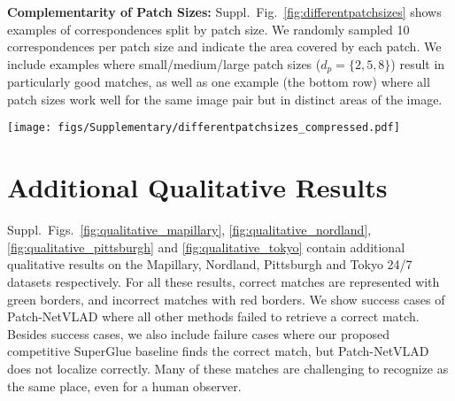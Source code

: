 \textbf{Complementarity of Patch Sizes:}
Suppl.~Fig.~\ref{fig:differentpatchsizes} shows examples of correspondences split by patch size. We randomly sampled 10 correspondences per patch size and indicate the area covered by each patch. We include examples where small/medium/large patch sizes (\ie $d_p=\{2, 5, 8\}$) result in particularly good matches, as well as one example (the bottom row) where all patch sizes work well for the same image pair but in distinct areas of the image.

\begin{figure*}[t!]
    \centering
    \texttt{[image: figs/Supplementary/differentpatchsizes\_compressed.pdf]}
    \caption{\textbf{Complementarity of Patch Sizes.} The three columns indicate different patch sizes, from small (\ie $d_p=2$) over medium (\ie $d_p=5$) to large (\ie $d_p=8$). It can be observed that a small patch size is able to find matches where smaller spatial context is more intuitive, for example, near boundaries between sky and buildings (first row, left column) or between sky and power lines (third row, left column). On the other hand, a larger patch size provides complementary cues by spanning over large building surfaces, enabling matching despite significant illumination variations (second row, right column). Note that the size of the squares does not reflect the receptive field sizes of the underlying features; different sizes are used for visualization purposes only.}
    \label{fig:differentpatchsizes}
\end{figure*}

\section{Additional Qualitative Results}
\label{sec:qualitative}
Suppl.~Figs.~\ref{fig:qualitative_mapillary}, \ref{fig:qualitative_nordland}, \ref{fig:qualitative_pittsburgh} and \ref{fig:qualitative_tokyo} contain additional qualitative results on the Mapillary, Nordland, Pittsburgh and Tokyo 24/7 datasets respectively. For all these results, correct matches are represented with green borders, and incorrect matches with red borders. We show success cases of Patch-NetVLAD where all other methods failed to retrieve a correct match. Besides success cases, we also include failure cases where our proposed competitive SuperGlue baseline finds the correct match, but Patch-NetVLAD does not localize correctly. Many of these matches are challenging to recognize as the same place, even for a human observer.

